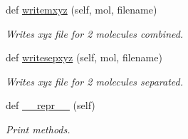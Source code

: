 \begin{DoxyCompactItemize}
def \hyperlink{classmolSimplify_1_1Classes_1_1mol3D_1_1mol3D_a21f8c2e9da6a3f0ec19120c00700f32b}{writemxyz} (self, mol, filename)
\begin{DoxyCompactList}\small\item\em Writes xyz file for 2 molecules combined. \end{DoxyCompactList}\item 
def \hyperlink{classmolSimplify_1_1Classes_1_1mol3D_1_1mol3D_a7448ad5d35a2801d08a05c3b5eea4835}{writesepxyz} (self, mol, filename)
\begin{DoxyCompactList}\small\item\em Writes xyz file for 2 molecules separated. \end{DoxyCompactList}\item 
def \hyperlink{classmolSimplify_1_1Classes_1_1mol3D_1_1mol3D_ac5a779ac0e20d07b60dc30fdb9a0f4d1}{\+\_\+\+\_\+repr\+\_\+\+\_\+} (self)
\begin{DoxyCompactList}\small\item\em Print methods. \end{DoxyCompactList}\end{DoxyCompactItemize}
